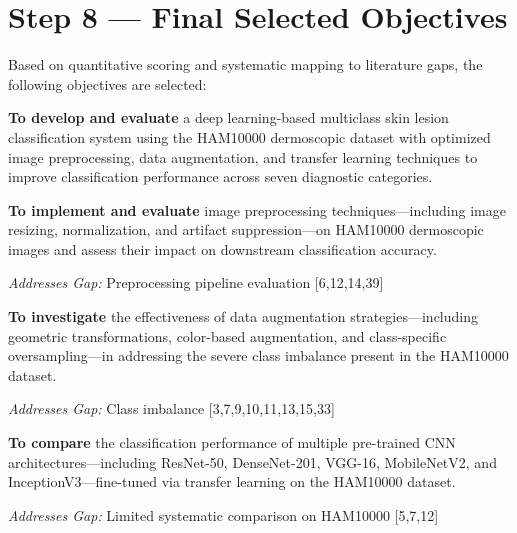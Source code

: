 \documentclass[11pt,a4paper]{article}
\begin{document}
\newpage

\section{Step 8 --- Final Selected Objectives}
\label{sec:step8}

Based on quantitative scoring and systematic mapping to literature gaps, the following objectives are selected:

\begin{objectivebox}
\textbf{To develop and evaluate} a deep learning-based multiclass skin lesion classification system using the HAM10000 dermoscopic dataset with optimized image preprocessing, data augmentation, and transfer learning techniques to improve classification performance across seven diagnostic categories.
\end{objectivebox}

\begin{objectivebox}
\textbf{To implement and evaluate} image preprocessing techniques---including image resizing, normalization, and artifact suppression---on HAM10000 dermoscopic images and assess their impact on downstream classification accuracy.

\smallskip
\textit{Addresses Gap:} Preprocessing pipeline evaluation [6,12,14,39]
\end{objectivebox}

\begin{objectivebox}
\textbf{To investigate} the effectiveness of data augmentation strategies---including geometric transformations, color-based augmentation, and class-specific oversampling---in addressing the severe class imbalance present in the HAM10000 dataset.

\smallskip
\textit{Addresses Gap:} Class imbalance [3,7,9,10,11,13,15,33]
\end{objectivebox}

\begin{objectivebox}
\textbf{To compare} the classification performance of multiple pre-trained CNN architectures---including ResNet-50, DenseNet-201, VGG-16, MobileNetV2, and InceptionV3---fine-tuned via transfer learning on the HAM10000 dataset.

\smallskip
\textit{Addresses Gap:} Limited systematic comparison on HAM10000 [5,7,12]
\end{objectivebox}
\end{document}
